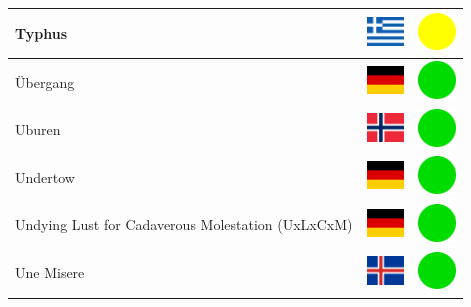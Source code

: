 \documentclass[12pt, a4paper, twoside]{report}
\begin{document}
\begin{center}
\begin{longtable}{|p{5cm}|p{2cm}|p{2cm}|}
 Typhus                                                     & \includegraphics[width=1cm]{4x3/gr} &   \includegraphics[width=1cm]{likes/m} \\ \hline
 Übergang                                                   & \includegraphics[width=1cm]{4x3/de} &   \includegraphics[width=1cm]{likes/y} \\ \hline
 Uburen                                                     & \includegraphics[width=1cm]{4x3/no} &   \includegraphics[width=1cm]{likes/y} \\ \hline
 Undertow                                                   & \includegraphics[width=1cm]{4x3/de} &   \includegraphics[width=1cm]{likes/y} \\ \hline
 Undying Lust for Cadaverous Molestation (UxLxCxM)          & \includegraphics[width=1cm]{4x3/de} &   \includegraphics[width=1cm]{likes/y} \\ \hline
 Une Misere                                                 & \includegraphics[width=1cm]{4x3/is} &   \includegraphics[width=1cm]{likes/y} \\ \hline

\end{longtable}
\end{center}
\end{document}
